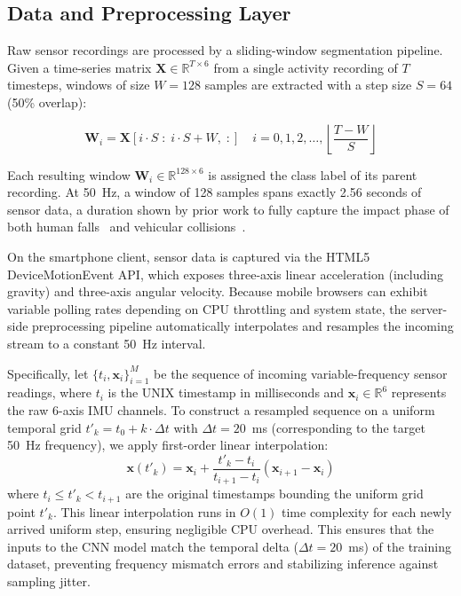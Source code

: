\documentclass[journal]{IEEEtran}
\begin{document}
\subsection{Data and Preprocessing Layer}
\label{sec:preprocessing}

Raw sensor recordings are processed by a sliding-window segmentation pipeline.
Given a time-series matrix $\mathbf{X} \in \mathbb{R}^{T \times 6}$ from a
single activity recording of $T$ timesteps, windows of size $W = 128$ samples
are extracted with a step size $S = 64$ (50\% overlap):

\begin{equation}
  \mathbf{W}_i = \mathbf{X}[i \cdot S \;:\; i \cdot S + W, \; :]
  \quad i = 0, 1, 2, \ldots, \left\lfloor \frac{T - W}{S} \right\rfloor
  \label{eq:sliding_window}
\end{equation}

Each resulting window $\mathbf{W}_i \in \mathbb{R}^{128 \times 6}$ is assigned
the class label of its parent recording. At 50~Hz, a window of 128 samples
spans exactly 2.56 seconds of sensor data, a duration shown by prior work
to fully capture the impact phase of both human falls~\cite{mobifall} and
vehicular collisions~\cite{bhatt2017}.

On the smartphone client, sensor data is captured via the HTML5 DeviceMotionEvent API, which exposes three-axis linear acceleration (including gravity) and three-axis angular velocity. Because mobile browsers can exhibit variable polling rates depending on CPU throttling and system state, the server-side preprocessing pipeline automatically interpolates and resamples the incoming stream to a constant 50~Hz interval. 

Specifically, let $\{t_i, \mathbf{x}_i\}_{i=1}^{M}$ be the sequence of incoming variable-frequency sensor readings, where $t_i$ is the UNIX timestamp in milliseconds and $\mathbf{x}_i \in \mathbb{R}^6$ represents the raw 6-axis IMU channels. To construct a resampled sequence on a uniform temporal grid $t'_k = t_0 + k \cdot \Delta t$ with $\Delta t = 20$~ms (corresponding to the target 50~Hz frequency), we apply first-order linear interpolation:
\begin{equation}
  \mathbf{x}(t'_k) = \mathbf{x}_i + \frac{t'_k - t_i}{t_{i+1} - t_i} \left( \mathbf{x}_{i+1} - \mathbf{x}_i \right)
  \label{eq:resampling}
\end{equation}
where $t_i \le t'_k < t_{i+1}$ are the original timestamps bounding the uniform grid point $t'_k$. This linear interpolation runs in $O(1)$ time complexity for each newly arrived uniform step, ensuring negligible CPU overhead. This ensures that the inputs to the CNN model match the temporal delta ($\Delta t = 20$~ms) of the training dataset, preventing frequency mismatch errors and stabilizing inference against sampling jitter.
\end{document}
